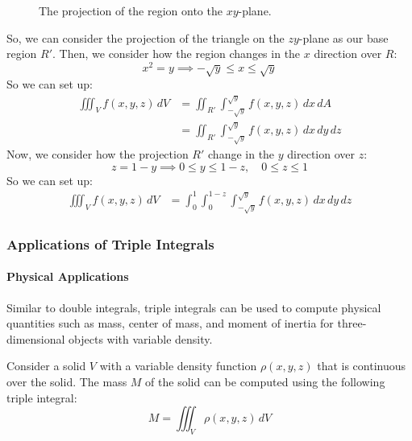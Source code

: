 \documentclass[11pt]{report}
\begin{document}
\begin{example}
\begin{figure}[h!]
        \caption{The projection of the region onto the $xy$-plane.}
        
    \end{figure}

    So, we can consider the projection of the triangle on the $zy$-plane as our base region $R'$. Then, we consider how the region changes in the $x$ direction over $R$:
    $$
        x^2 = y \implies -\sqrt{y} \le x \le \sqrt{y}
    $$
    So we can set up:
    \begin{align*}
        \iiint_V f(x,y,z) \, dV &= \iint_{R'} \int_{-\sqrt{y}}^{\sqrt{y}} f(x,y,z) \, dx \, dA \\
        &= \iint_{R'} \int_{-\sqrt{y}}^{\sqrt{y}} f(x,y,z) \, dx \, dy \, dz
    \end{align*}
    Now, we consider how the projection $R'$ change in the $y$ direction over $z$:
    $$        z = 1 - y \implies 0 \le y \le 1 - z, \quad 0 \le z \le 1
    $$
    So we can set up:
    \begin{align*}
        \iiint_V f(x,y,z) \, dV &= \int_0^1 \int_0^{1 - z} \int_{-\sqrt{y}}^{\sqrt{y}} f(x,y,z) \, dx \, dy \, dz
    \end{align*}
\end{example}
\subsubsection{Applications of Triple Integrals}
\paragraph{Physical Applications} Similar to double integrals, triple integrals can be used to compute physical quantities such as mass, center of mass, and moment of inertia for three-dimensional objects with variable density. 
\begin{definition}
    Consider a solid $V$ with a variable density function $\rho(x,y,z)$ that is continuous over the solid. The mass $M$ of the solid can be computed using the following triple integral:
    \begin{equation}
        M = \iiint_V \rho(x,y,z) \, dV
    \end{equation}
    
\end{definition}
\end{document}
